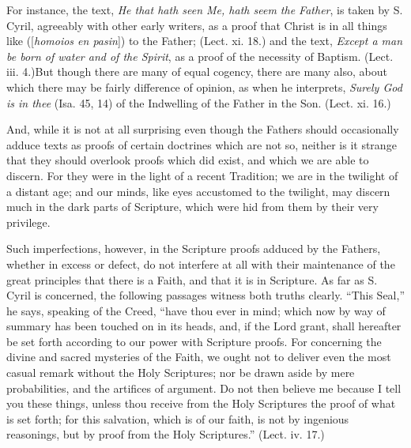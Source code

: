 For instance, the text, \emph{He
that hath seen Me, hath seem the Father}, is taken by S. Cyril,
agreeably with other early writers, as a proof that Christ is in all
things like ([\emph{homoios en pasin}]) to the Father; (Lect. xi. 18.)
and the text, \emph{Except a man be born of water and of the Spirit},
as a proof of the necessity of Baptism. (Lect. iii. 4.)\emph{}But
though there are many of equal cogency, there are many also, about
which there may be fairly difference of opinion, as when he
interprets, \emph{Surely God is in thee} (Isa. 45, 14) of the
Indwelling of the Father in the Son. (Lect. xi. 16.)

And, while it is not at all
surprising even though the Fathers should occasionally adduce texts as
proofs of certain doctrines which are not so, neither is it strange
that they should overlook proofs which did exist, and which we are
able to discern. For they were in the light of a recent Tradition; we
are in the twilight of a distant age; and our minds, like eyes
accustomed to the twilight, may discern much in the dark parts of
Scripture, which were hid from them by their very privilege.

Such imperfections, however,
in the Scripture proofs adduced by the Fathers, whether in excess or
defect, do not interfere at all with their maintenance of the great
principles that there is a Faith, and that it is in Scripture. As far
as S. Cyril is concerned, the following passages witness both truths
clearly. ``This Seal,'' he says, speaking of the Creed, ``have thou ever
in mind; which now by way of summary has been touched on in its heads,
and, if the Lord grant, shall hereafter be set forth according to our
power with Scripture proofs. For concerning the divine and sacred
mysteries of the Faith, we ought not to deliver even the most casual
remark without the Holy Scriptures; nor be drawn aside by mere
probabilities, and the artifices of argument. Do not then believe me
because I tell you these things, unless thou receive from the Holy
Scriptures the proof of what is set forth; for this salvation, which
is of our faith, is not by ingenious reasonings, but by proof from the
Holy Scriptures.'' (Lect. iv. 17.)

